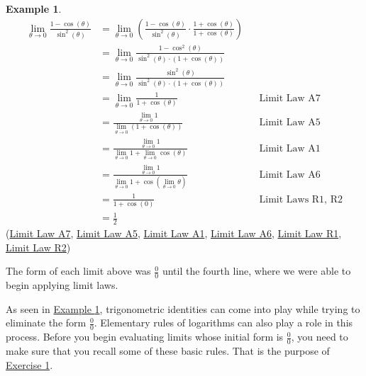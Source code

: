 \documentclass[10pt,oneside,]{book}
\theoremstyle{plain}
\theoremstyle{definition}
\newtheorem{example}[theorem]{Example}
\numberwithin{equation}{section}
\newcommand{\fe}[2]{#1\mathopen{}\left(#2\right)\mathclose{}}
\begin{document}
\begin{example}\label{example-second-indeterminate}
\begin{align*}
\lim_{\theta\to0}\frac{1-\fe{\cos}{\theta}}{\fe{\sin^2}{\theta}}&=\lim_{\theta\to0}\left(\frac{1-\fe{\cos}{\theta}}{\fe{\sin^2}{\theta}}\cdot\frac{1+\fe{\cos}{\theta}}{1+\fe{\cos}{\theta}}\right)\\
&=\lim_{\theta\to0}\frac{1-\fe{\cos^2}{\theta}}{\fe{\sin^2}{\theta}\cdot\left(1+\fe{\cos}{\theta}\right)}\\
&=\lim_{\theta\to0}\frac{\fe{\sin^2}{\theta}}{\fe{\sin^2}{\theta}\cdot\left(1+\fe{\cos}{\theta}\right)}\\
&=\lim_{\theta\to0}\frac{1}{1+\fe{\cos}{\theta}}&&\text{Limit Law A7}\\
&=\frac{\lim_{\theta\to0}1}{\lim_{\theta\to0}\left(1+\fe{\cos}{\theta}\right)}&&\text{Limit Law A5}\\
&=\frac{\lim_{\theta\to0}1}{\lim_{\theta\to0}1+\lim_{\theta\to0}\fe{\cos}{\theta}}&&\text{Limit Law A1}\\
&=\frac{\lim_{\theta\to0}1}{\lim_{\theta\to0}1+\fe{\cos}{\lim_{\theta\to0}\theta}}&&\text{Limit Law A6}\\
&=\frac{1}{1+\fe{\cos}{0}}&&\text{Limit Laws R1, R2}\\
&=\frac{1}{2}
\end{align*}(\hyperref[lla7]{Limit Law A7}, \hyperref[lla5]{Limit Law A5}, \hyperref[lla1]{Limit Law A1}, \hyperref[lla6]{Limit Law A6}, \hyperref[llr1]{Limit Law R1}, \hyperref[llr2]{Limit Law R2})%
\par
The form of each limit above was \(\frac{0}{0}\) until the fourth line, where we were able to begin applying limit laws.%
\end{example}
\par
As seen in \hyperref[example-second-indeterminate]{Example \ref{example-second-indeterminate}}, trigonometric identities can come into play while trying to eliminate the form \(\frac{0}{0}\). Elementary rules of logarithms can also play a role in this process. Before you begin evaluating limits whose initial form is \(\frac{0}{0}\), you need to make sure that you recall some of these basic rules. That is the purpose of \hyperlink{exercise-identities-review}{Exercise 1}.%
\typeout{************************************************}
\typeout{************************************************}
\end{document}
